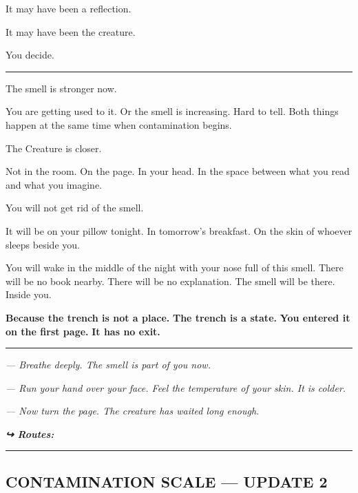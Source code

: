 \noindent It may have been a reflection.

\noindent It may have been the creature.

\noindent You decide.

\vspace{0.5em}\noindent\rule{\textwidth}{0.5pt}\vspace{0.5em}

\noindent The smell is stronger now.

\noindent You are getting used to it. Or the smell is increasing. Hard to tell. Both things happen at the same time when contamination begins.

\noindent The Creature is closer.

\noindent Not in the room. On the page. In your head. In the space between what you read and what you imagine.

\noindent You will not get rid of the smell.

\noindent It will be on your pillow tonight.
In tomorrow's breakfast.
On the skin of whoever sleeps beside you.

\noindent You will wake in the middle of the night with your nose full of this smell.
There will be no book nearby.
There will be no explanation.
The smell will be there. Inside you.

\noindent \textbf{Because the trench is not a place.}
\textbf{The trench is a state.}
\textbf{You entered it on the first page.}
\textbf{It has no exit.}

\vspace{0.5em}\noindent\rule{\textwidth}{0.5pt}\vspace{0.5em}

\noindent \textit{--- Breathe deeply. The smell is part of you now.}

\noindent \textit{--- Run your hand over your face. Feel the temperature of your skin. It is colder.}

\noindent \textit{--- Now turn the page. The creature has waited long enough.}

\vspace{0.5em}
\noindent\textit{\textbf{↪ Routes:}  \rotasep {}}

\vspace{0.5em}\noindent\rule{\textwidth}{0.5pt}\vspace{0.5em}

\subsection*{CONTAMINATION SCALE --- UPDATE 2}

